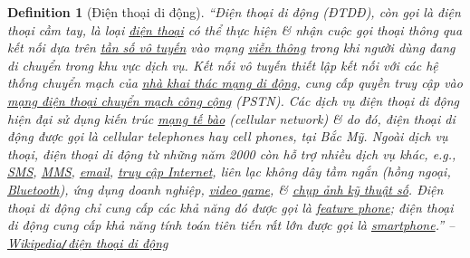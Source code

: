 \documentclass[12pt,oneside]{book}
\newtheorem{definition}{Definition}[section]
\begin{document}
\begin{definition}[Điện thoại di động]
	\label{def: điện thoại di động}
	``\emph{Điện thoại di động} (\emph{ĐTDĐ}), còn gọi là \emph{điện thoại cầm tay}, là loại \href{https://vi.wikipedia.org/wiki/%C4%90i%E1%BB%87n_tho%E1%BA%A1i}{điện thoại} có thể thực hiện \& nhận cuộc gọi thoại thông qua kết nối dựa trên \href{https://vi.wikipedia.org/wiki/T%E1%BA%A7n_s%E1%BB%91_v%C3%B4_tuy%E1%BA%BFn}{tần số vô tuyến} vào mạng \href{https://vi.wikipedia.org/wiki/Vi%E1%BB%85n_th%C3%B4ng}{viễn thông} trong khi người dùng đang di chuyển trong khu vực dịch vụ. Kết  nối vô tuyến thiết lập kết nối với các hệ thống chuyển mạch của \href{https://vi.wikipedia.org/wiki/Nh%C3%A0_m%E1%BA%A1ng}{nhà khai thác mạng di động}, cung cấp quyền truy cập vào \href{https://vi.wikipedia.org/wiki/M%E1%BA%A1ng_%C4%91i%E1%BB%87n_tho%E1%BA%A1i_chuy%E1%BB%83n_m%E1%BA%A1ch_c%C3%B4ng_c%E1%BB%99ng}{mạng điện thoại chuyển mạch công cộng} (PSTN). Các dịch vụ điện thoại di động hiện đại sử dụng kiến trúc \href{https://vi.wikipedia.org/wiki/M%E1%BA%A1ng_thi%E1%BA%BFt_b%E1%BB%8B_di_%C4%91%E1%BB%99ng}{mạng tế bào} (cellular network) \& do đó, điện thoại di động được gọi là \emph{cellular telephones} hay \emph{cell phones}, tại Bắc Mỹ. Ngoài dịch vụ thoại, điện thoại di động từ những năm 2000 còn hỗ trợ nhiều dịch vụ khác, e.g., \href{https://vi.wikipedia.org/wiki/SMS}{SMS}, \href{https://vi.wikipedia.org/wiki/D%E1%BB%8Bch_v%E1%BB%A5_nh%E1%BA%AFn_tin_%C4%91a_ph%C6%B0%C6%A1ng_ti%E1%BB%87n}{MMS}, \href{https://vi.wikipedia.org/wiki/Email}{email}, \href{https://vi.wikipedia.org/wiki/Truy_c%E1%BA%ADp_Internet}{truy cập Internet}, liên lạc không dây tầm ngắn (hồng ngoại, \href{https://vi.wikipedia.org/wiki/Bluetooth}{Bluetooth}), ứng dụng doanh nghiệp, \href{https://vi.wikipedia.org/wiki/Video_game}{video game}, \& \href{https://vi.wikipedia.org/wiki/Ch%E1%BB%A5p_%E1%BA%A3nh_k%E1%BB%B9_thu%E1%BA%ADt_s%E1%BB%91}{chụp ảnh kỹ thuật số}. Điện thoại di động chỉ cung cấp các khả năng đó được gọi là \href{https://vi.wikipedia.org/wiki/%C4%90i%E1%BB%87n_tho%E1%BA%A1i_ph%E1%BB%95_th%C3%B4ng}{feature phone}; điện thoại di động cung cấp khả năng tính toán tiên tiến rất lớn được gọi là \href{https://vi.wikipedia.org/wiki/Smartphone}{smartphone}.'' -- \href{https://vi.wikipedia.org/wiki/%C4%90i%E1%BB%87n_tho%E1%BA%A1i_di_%C4%91%E1%BB%99ng}{Wikipedia\emph{{\tt/}}điện thoại di động}
\end{definition}
\end{document}
